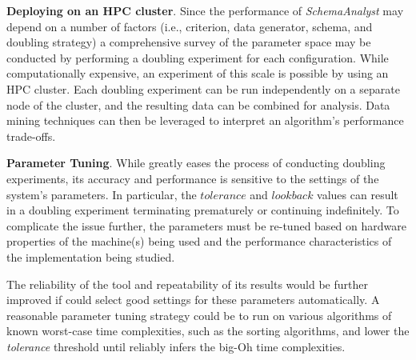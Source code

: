 
{\bf Deploying on an HPC cluster}.
Since the performance of \textit{SchemaAnalyst} may depend on a number
of factors (i.e., criterion, data generator, schema, and doubling strategy) a
comprehensive survey of the parameter space may be conducted by
performing a doubling experiment for each configuration. While
computationally expensive, an experiment of this scale is possible by
using an HPC cluster. Each doubling experiment can be run independently
on a separate node of the cluster, and the resulting data can be combined
for analysis. Data mining techniques can then be leveraged to interpret
an algorithm's performance trade-offs.


 {\bf Parameter Tuning}.  While \toolname greatly eases the process of
 conducting doubling experiments, its accuracy and performance is sensitive to
 the settings of the system's parameters.  In particular, the
 $\mathit{tolerance}$ and $\mathit{lookback}$ values can result in a doubling
 experiment terminating prematurely or continuing indefinitely.  To complicate
 the issue further, the parameters must be re-tuned based on hardware
 properties of the machine(s) being used and the performance characteristics of
 the implementation being studied.

  The reliability of the tool and repeatability of its results would be further
  improved if \toolname could select good settings for these parameters
  automatically. A reasonable parameter tuning strategy could be to run
  \toolname on various algorithms of known worst-case time complexities, such
  as the sorting algorithms, and lower the \textit{tolerance} threshold until
  \toolname reliably infers the big-Oh time complexities.

